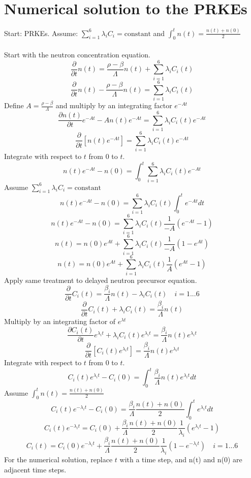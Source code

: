 \documentclass[]{article}
\begin{document}
		\section*{\textbf{Numerical solution to the PRKEs}} Start: PRKEs. Assume: $\sum_{i=1}^{6}\lambda_i C_i=\textrm{constant}$ and $\int_{0}^{t}n(t) = \frac{n(t)+n(0)}{2}$\\\\
		Start with the neutron concentration equation.
		\[
		\frac{\partial}{\partial t}n(t)= \frac{\rho-\beta}{\Lambda}n(t)+\sum_{i=1}^{6}\lambda_i C_i(t)
		\]
		\[
		\frac{\partial}{\partial t}n(t)-\frac{\rho-\beta}{\Lambda}n(t)= \sum_{i=1}^{6}\lambda_i C_i(t)
		\]
		Define $A=\frac{\rho-\beta}{\Lambda}$ and multiply by an integrating factor $e^{-At}$
		\[
		\frac{\partial n(t)}{\partial t}e^{-At}-An(t)e^{-At}= \sum_{i=1}^{6}\lambda_i C_i(t)e^{-At}
		\]
		\[
		\frac{\partial}{\partial t}\left[n(t)e^{-At}\right]= \sum_{i=1}^{6}\lambda_i C_i(t)e^{-At}
		\]
		Integrate with respect to $t$ from 0 to $t$.
		\[
		n(t)e^{-At}-n(0)= \int_{0}^{t}\sum_{i=1}^{6}\lambda_i C_i(t)e^{-At}
		\]
		Assume $\sum_{i=1}^{6}\lambda_i C_i=\textrm{constant}$
		\[
		n(t)e^{-At}-n(0)= \sum_{i=1}^{6}\lambda_i C_i(t)\int_{0}^{t}e^{-At}dt
		\]
		\[
		n(t)e^{-At}-n(0)= \sum_{i=1}^{6}\lambda_i C_i(t)\frac{1}{-A}(e^{-At}-1)
		\]
		\[
		n(t)=n(0)e^{At} +\sum_{i=1}^{6}\lambda_i C_i(t)\frac{1}{-A}(1-e^{At})
		\]
		\[
		n(t)=n(0)e^{At} +\sum_{i=1}^{6}\lambda_i C_i(t)\frac{1}{A}(e^{At}-1)
		\]
		Apply same treatment to delayed neutron precursor equation.
		\[
		\frac{\partial}{\partial t}C_i(t) =\frac{\beta_i}{\Lambda}n(t)-\lambda_iC_i(t) \quad i=1...6
		\]
		\[
		\frac{\partial}{\partial t}C_i(t)+\lambda_iC_i(t) =\frac{\beta_i}{\Lambda}n(t)
		\]
		Multiply by an integrating factor of $e^{\lambda t}$
		\[
		\frac{\partial C_i(t)}{\partial t}e^{\lambda_i t}+\lambda_iC_i(t)e^{\lambda_i t} =\frac{\beta_i}{\Lambda}n(t)e^{\lambda_i t}
		\]
		\[
		\frac{\partial}{\partial t}\left[C_i(t)e^{\lambda_i t}\right] =\frac{\beta_i}{\Lambda}n(t)e^{\lambda_i t}
		\]
		Integrate with respect to $t$ from 0 to $t$.
		\[
		C_i(t)e^{\lambda_i t} - C_i(0) =\int_{0}^{t} \frac{\beta_i}{\Lambda}n(t)e^{\lambda_i t}dt
		\]
		Assume $\int_{0}^{t}n(t) = \frac{n(t)+n(0)}{2}$
		\[
		C_i(t)e^{-\lambda_i t} - C_i(0) =\frac{\beta_i}{\Lambda}\frac{n(t)+n(0)}{2}\int_{0}^{t} e^{\lambda_i t}dt
		\]
		\[
		C_i(t)e^{-\lambda_i t} =C_i(0)+\frac{\beta_i}{\Lambda}\frac{n(t)+n(0)}{2}\frac{1}{\lambda_i}(e^{\lambda_i t}-1)
		\]
		\[
		C_i(t) =C_i(0)e^{-\lambda_i t}+\frac{\beta_i}{\Lambda}\frac{n(t)+n(0)}{2}\frac{1}{\lambda_i}(1-e^{-\lambda_i t})\quad i=1...6
		\]
		For the numerical solution, replace $t$ with a time step, and n(t) and n(0) are adjacent time steps.
		
		
\end{document}
